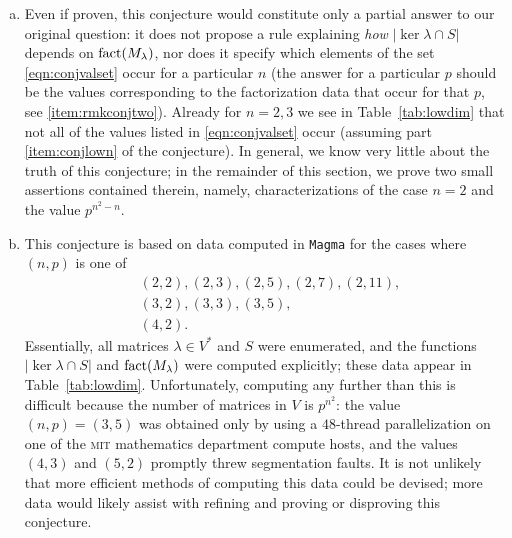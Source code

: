 \begin{rem}
\label{rem:conj}
\begin{enumerate}[(a)]
\item Even if proven, this conjecture would constitute only a partial answer to our original question: it does not propose a rule explaining \emph{how} $|\ker\lambda\cap S|$ depends on $\operatorname{fact}(M_\lambda)$, nor does it specify which elements of the set \eqref{eqn:conjvalset} occur for a particular $n$ (the answer for a particular $p$ should be the values corresponding to the factorization data that occur for that $p$, see \eqref{item:rmkconjtwo}). Already for $n=2,3$ we see in Table~\ref{tab:lowdim} that not all of the values listed in \eqref{eqn:conjvalset} occur (assuming part \eqref{item:conjlown} of the conjecture). In general, we know very little about the truth of this conjecture; in the remainder of this section, we prove two small assertions contained therein, namely, characterizations of the case $n=2$ and the value $p^{n^2-n}$.
\item This conjecture is based on data computed in \texttt{Magma} \cite{magma} for the cases where $(n,p)$ is one of
\begin{align*}
&(2,2),(2,3),(2,5),(2,7),(2,11),\\
&(3,2),(3,3),(3,5),\\
&(4,2).
\end{align*}
Essentially, all matrices $\lambda\in V^*$ and $S$ were enumerated, and the functions $|\ker\lambda\cap S|$ and $\operatorname{fact}(M_\lambda)$ were computed explicitly; these data appear in Table~\ref{tab:lowdim}. Unfortunately, computing any further than this is difficult because the number of matrices in $V$ is $p^{n^2}$: the value $(n,p)=(3,5)$ was obtained only by using a $48$-thread parallelization on one of the \textsc{mit} mathematics department compute hosts, and the values $(4,3)$ and $(5,2)$ promptly threw segmentation faults. It is not unlikely that more efficient methods of computing this data could be devised; more data would likely assist with refining and proving or disproving this conjecture.\label{item:rmkconjone}


\end{enumerate}
\end{rem}
